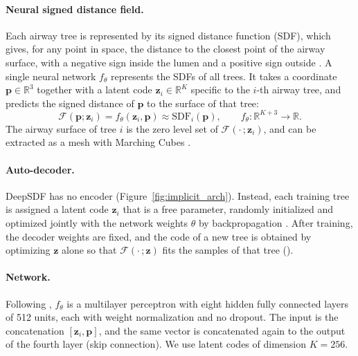 \paragraph{Neural signed distance field.}  %
Each airway tree is represented by its signed distance function (SDF), which gives, for any
point in space, the distance to the closest point of the airway surface, with a negative
sign inside the lumen and a positive sign outside \cite{park2019}. A single neural network
$f_\theta$ represents the SDFs of all trees. It takes a coordinate
$\mathbf{p} \in \mathbb{R}^3$ together with a latent code $\mathbf{z}_i \in \mathbb{R}^K$
specific to the $i$-th airway tree, and predicts the signed distance of $\mathbf{p}$ to the
surface of that tree:
\begin{equation}
  \mathcal{F}(\mathbf{p}; \mathbf{z}_i) = f_\theta(\mathbf{z}_i, \mathbf{p})
  \approx \mathrm{SDF}_i(\mathbf{p}),
  \qquad f_\theta : \mathbb{R}^{K+3} \to \mathbb{R}.
  \label{eq:implicit_sdf}                %
\end{equation}
The airway surface of tree $i$ is the zero level set of $\mathcal{F}(\cdot\,; \mathbf{z}_i)$,
and can be extracted as a mesh with Marching Cubes \cite{lorensen1987}.

\paragraph{Auto-decoder.}                %
DeepSDF has no encoder (Figure~\ref{fig:implicit_arch}). Instead, each training tree is
assigned a latent code $\mathbf{z}_i$ that is a free parameter, randomly initialized and
optimized jointly with the network weights $\theta$ by backpropagation
\cite{park2019}. After training, the decoder weights are fixed, and the code of a new tree
is obtained by optimizing $\mathbf{z}$ alone so that $\mathcal{F}(\cdot\,; \mathbf{z})$ fits
the samples of that tree ().

\paragraph{Network.}                     %
Following \citet{park2019}, $f_\theta$ is a multilayer perceptron with eight hidden
fully connected layers of 512 units, each with weight normalization \cite{salimans2016} and
no dropout. The input is the concatenation $[\mathbf{z}_i, \mathbf{p}]$, and the same vector
is concatenated again to the output of the fourth layer (skip connection). We use latent
codes of dimension $K = 256$.

